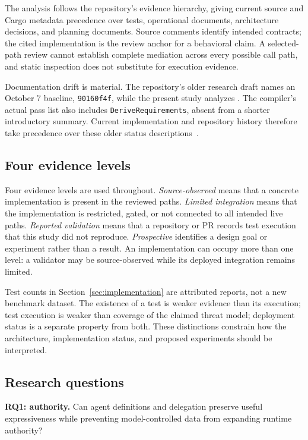 The analysis follows the repository's evidence hierarchy, giving current source and Cargo metadata precedence over tests, operational documents, architecture decisions, and planning documents. Source comments identify intended contracts; the cited implementation is the review anchor for a behavioral claim. A selected-path review cannot establish complete mediation across every possible call path, and static inspection does not substitute for execution evidence.

Documentation drift is material. The repository's older research draft names an October 7 baseline, \texttt{90160f4f}, while the present study analyzes \artifactshort{}. The compiler's actual pass list also includes \texttt{DeriveRequirements}, absent from a shorter introductory summary. Current implementation and repository history therefore take precedence over these older status descriptions~\cite{ref9,ref5,ref10}.

\subsection{Four evidence levels}

Four evidence levels are used throughout. \emph{Source-observed} means that a concrete implementation is present in the reviewed paths. \emph{Limited integration} means that the implementation is restricted, gated, or not connected to all intended live paths. \emph{Reported validation} means that a repository or PR records test execution that this study did not reproduce. \emph{Prospective} identifies a design goal or experiment rather than a result. An implementation can occupy more than one level: a validator may be source-observed while its deployed integration remains limited.

Test counts in Section~\ref{sec:implementation} are attributed reports, not a new benchmark dataset. The existence of a test is weaker evidence than its execution; test execution is weaker than coverage of the claimed threat model; deployment status is a separate property from both. These distinctions constrain how the architecture, implementation status, and proposed experiments should be interpreted.

\subsection{Research questions}

\textbf{RQ1: authority.} Can agent definitions and delegation preserve useful expressiveness while preventing model-controlled data from expanding runtime authority?


